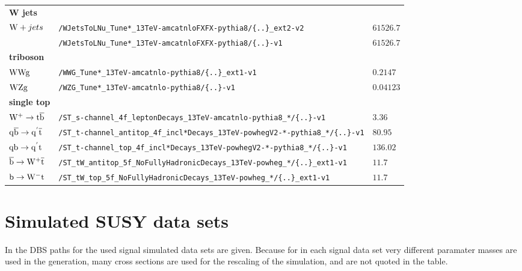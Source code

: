 \begin{table}[tb]
\begin{tabular}[width=\textwidth]{lll}
  \textbf{W jets}                                  &                         &                                           \\
  $\mathrm{W}+jets$                                       & \verb|/WJetsToLNu_Tune*_13TeV-amcatnloFXFX-pythia8/{..}_ext2-v2| & $61526.7$                                 \\
                                                   & \verb|/WJetsToLNu_Tune*_13TeV-amcatnloFXFX-pythia8/{..}-v1| & $61526.7$                                 \\
  \textbf{triboson}                                &                         &                                           \\
  $\mathrm{W}\mathrm{W}\mathrm{g}$                                      & \verb|/WWG_Tune*_13TeV-amcatnlo-pythia8/{..}_ext1-v1| & $0.2147$                                  \\
  $\mathrm{W}\mathrm{Z}\mathrm{g}$                                      & \verb|/WZG_Tune*_13TeV-amcatnlo-pythia8/{..}-v1| & $0.04123$                                 \\
  \textbf{single top}                              &                         &                                           \\
  $\mathrm{W^+}\to\mathrm{t}\overline{\mathrm{b}}$                             & \verb|/ST_s-channel_4f_leptonDecays_13TeV-amcatnlo-pythia8_*/{..}-v1| & $3.36$                                    \\
  $\mathrm{q}\overline{\mathrm{b}}\to\mathrm{q}^{'}\overline{\mathrm{t}}$                    & \verb|/ST_t-channel_antitop_4f_incl*Decays_13TeV-powhegV2-*-pythia8_*/{..}-v1| & $80.95$                                   \\
  $\mathrm{q}\mathrm{b}\to\mathrm{q}^{'}\mathrm{t}$                      & \verb|/ST_t-channel_top_4f_incl*Decays_13TeV-powhegV2-*-pythia8_*/{..}-v1| & $136.02$                                  \\
  $\overline{\mathrm{b}}\to\mathrm{W^+}\overline{\mathrm{t}}$                            & \verb|/ST_tW_antitop_5f_NoFullyHadronicDecays_13TeV-powheg_*/{..}_ext1-v1| & $11.7$                                    \\
  $\mathrm{b}\to\mathrm{W^-}\mathrm{t}$                              & \verb|/ST_tW_top_5f_NoFullyHadronicDecays_13TeV-powheg_*/{..}_ext1-v1| & $11.7$                                    \\
  \hline
 \end{tabular}
\end{table}

\FloatBarrier
\section*{Simulated SUSY data sets}
In  the DBS paths for the used signal simulated data sets are given. Because for in each signal data set very different paramater masses are used in the generation, many cross sections are used for the rescaling of the simulation, and are not quoted in the table.


